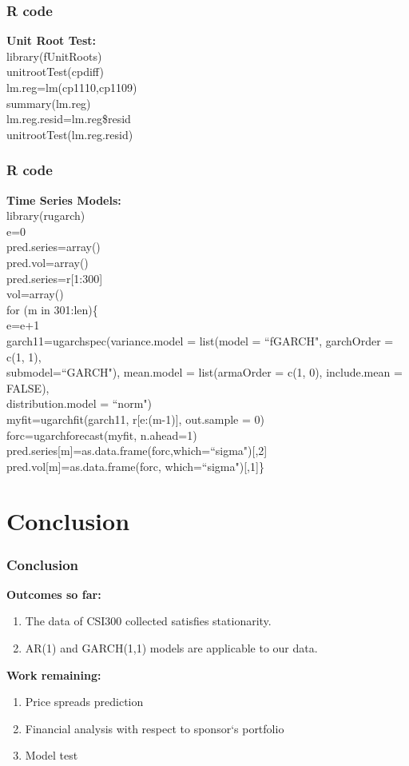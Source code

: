 \documentclass[compress,handout,10pt]{beamer}
\let\olditem\item
\renewcommand{\item}{\setlength{\itemsep}{0.5\baselineskip}\olditem}
\begin{document}
\begin{frame}
    \frametitle{R code}
{\bf{Unit Root Test:}}\\
library(fUnitRoots)\\
unitrootTest(cpdiff)\\
lm.reg=lm(cp1110,cp1109)\\
summary(lm.reg)\\
lm.reg.resid=lm.reg\$resid\\
unitrootTest(lm.reg.resid)\\
\end{frame}
\begin{frame}
    \frametitle{R code}
{\bf{Time Series Models:}}\\
library(rugarch)\\
e=0\\
pred.series=array()\\
pred.vol=array()\\
pred.series=r[1:300]\\
vol=array()\\
for (m in 301:len)\{\\
  e=e+1\\
  garch11=ugarchspec(variance.model = list(model = ``fGARCH", garchOrder = c(1, 1),\\ submodel=``GARCH"), mean.model = list(armaOrder = c(1, 0), include.mean = FALSE),\\ distribution.model = ``norm")\\
  myfit=ugarchfit(garch11, r[e:(m-1)], out.sample = 0)\\
  forc=ugarchforecast(myfit, n.ahead=1)\\
  pred.series[m]=as.data.frame(forc,which=``sigma")[,2]\\
  pred.vol[m]=as.data.frame(forc, which=``sigma")[,1]\}

\end{frame}

\section{Conclusion}
\begin{frame}
    \frametitle{Conclusion}
{\bf{Outcomes so far:}}\\
\begin{enumerate}
\item The data of CSI300 collected satisfies stationarity.
\item AR(1) and GARCH(1,1) models are applicable to our data. 
\end{enumerate}
{\bf{Work remaining:}}\\
\begin{enumerate}
\item Price spreads prediction
\item Financial analysis with respect to sponsor`s portfolio
\item Model test
\end{enumerate}  
\end{frame}
\end{document}
